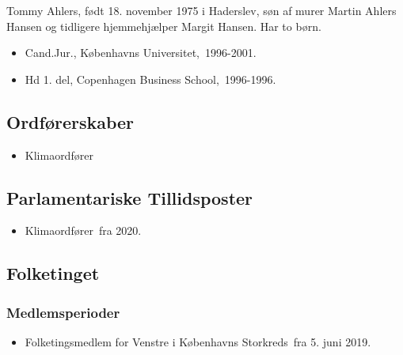 \documentclass[11pt, a4paper]{awesome-cv}
\begin{document}
\makecvheader[R]
\makelettertitle
\begin{cvletter}
Tommy Ahlers, født 18. november 1975 i Haderslev, søn af murer Martin Ahlers Hansen og tidligere hjemmehjælper Margit Hansen. Har to børn.

\begin{itemize}
\item Cand.Jur., Københavns Universitet, 1996-2001.
\item Hd 1. del, Copenhagen Business School, 1996-1996.
\end{itemize}
\subsection*{Ordførerskaber}
\begin{itemize}
\item Klimaordfører
\end{itemize}
\subsection*{Parlamentariske Tillidsposter}
\begin{itemize}
\item Klimaordfører fra 2020.
\end{itemize}
\subsection*{Folketinget}
\subsubsection*{Medlemsperioder}
\begin{itemize}
\item Folketingsmedlem for Venstre i Københavns Storkreds fra 5. juni 2019.
\end{itemize}

\end{cvletter}
\end{document}

